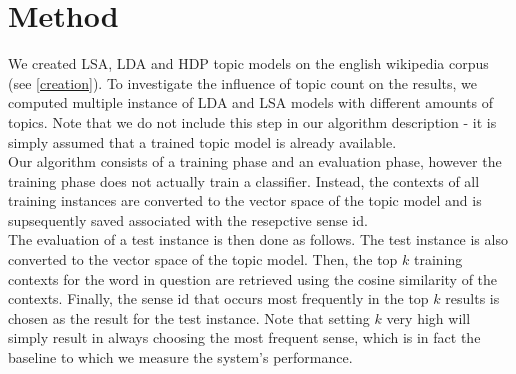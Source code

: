 \section{Method}

\thispagestyle{plain}

We created LSA, LDA and HDP topic models on the english wikipedia corpus (see \ref{creation}). To investigate the influence of topic count on the results, we  computed multiple instance of LDA and LSA models with different amounts of topics. Note that we do not include this step in our algorithm description - it is simply assumed that a trained topic model is already available.\\

Our algorithm consists of a training phase and an evaluation phase, however the training phase does not actually train a classifier. Instead, the contexts of all training instances are converted to the vector space of the topic model and is supsequently saved associated with the resepctive sense id.\\
The evaluation of a test instance is then done as follows. The test instance is also converted to the vector space of the topic model. Then, the top $k$ training contexts for the word in question are retrieved using the cosine similarity of the contexts. Finally, the sense id that occurs most frequently in the top $k$ results is chosen as the result for the test instance. Note that setting $k$ very high will simply result in always choosing the most frequent sense, which is in fact the baseline to which we measure the system's performance.\\



%

